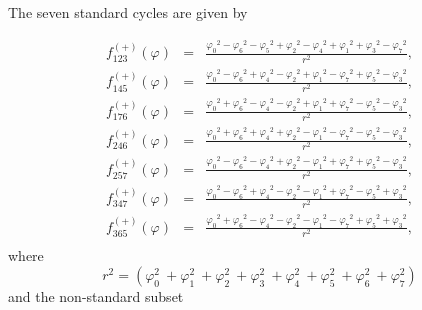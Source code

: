 \documentclass[a4paper,12pt]{book}
\begin{document}
The seven standard cycles are given by

\begin{eqnarray}
{{f}_{123}^{(+)}{(\varphi )}} &=&{\frac{{\varphi _{0}}^{2}-{\varphi _{6}}%
^{2}-{\varphi _{5}}^{2}+{\varphi _{2}}^{2}-{\varphi _{4}}^{2}+{\varphi _{1}}%
^{2}+{\varphi _{3}}^{2}-{\varphi _{7}}^{2}}{r^{2}},}  \nonumber
\label{ptor1} \\
{{f}_{145}^{(+)}{(\varphi )}} &=&{\frac{{\varphi _{0}}^{2}-{\varphi _{6}}%
^{2}+{\varphi _{4}}^{2}-{\varphi _{2}}^{2}+{\varphi _{1}}^{2}-{\varphi _{7}}%
^{2}+{\varphi _{5}}^{2}-{\varphi _{3}}^{2}}{r^{2}},}  \nonumber \\
{{f}_{176}^{(+)}{(\varphi )}} &=&{\frac{{\varphi _{0}}^{2}+{\varphi _{6}}%
^{2}-{\varphi _{4}}^{2}-{\varphi _{2}}^{2}+{\varphi _{1}}^{2}+{\varphi _{7}}%
^{2}-{\varphi _{5}}^{2}-{\varphi _{3}}^{2}}{r^{2}},}  \nonumber \\
{{f}_{246}^{(+)}{(\varphi )}} &=&{\frac{{\varphi _{0}}^{2}+{\varphi _{6}}%
^{2}+{\varphi _{4}}^{2}+{\varphi _{2}}^{2}-{\varphi _{1}}^{2}-{\varphi _{7}}%
^{2}-{\varphi _{5}}^{2}-{\varphi _{3}}^{2}}{{r^{2}}},}  \nonumber \\
{{f}_{257}^{(+)}{(\varphi )}} &=&{\frac{{\varphi _{0}}^{2}-{\varphi _{6}}%
^{2}-{\varphi _{4}}^{2}+{\varphi _{2}}^{2}-{\varphi _{1}}^{2}+{\varphi _{7}}%
^{2}+{\varphi _{5}}^{2}-{\varphi _{3}}^{2}}{{r^{2}}},}  \nonumber \\
{{f}_{347}^{(+)}{(\varphi )}} &=&{\frac{{\varphi _{0}}^{2}-{\varphi _{6}}%
^{2}+{\varphi _{4}}^{2}-{\varphi _{2}}^{2}-{\varphi _{1}}^{2}+{\varphi _{7}}%
^{2}-{\varphi _{5}}^{2}+{\varphi _{3}}^{2}}{r^{2}},}  \nonumber \\
{{f}_{365}^{(+)}{(\varphi )}} &=&{\frac{{\varphi _{0}}^{2}+{\varphi _{6}}%
^{2}-{\varphi _{4}}^{2}-{\varphi _{2}}^{2}-{\varphi _{1}}^{2}-{\varphi _{7}}%
^{2}+{\varphi _{5}}^{2}+{\varphi _{3}}^{2}}{r^{2}},}  \nonumber \\
&&
\end{eqnarray}
where 
\begin{equation}
r^{2}=(\varphi _{0}^{2}{\ +}\varphi _{1}^{2}{\ +}\varphi _{2}^{2}{\ +}%
\varphi _{3}^{2}{\ +}\varphi _{4}^{2}{\ +}\varphi _{5}^{2}{\ +}\varphi
_{6}^{2}{\ +}\varphi _{7}^{2})
\end{equation}
and the non-standard subset 
\end{document}
